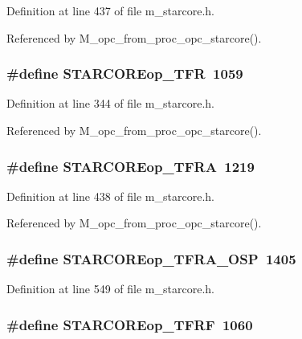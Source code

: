 Definition at line 437 of file m\_\-starcore.h.

Referenced by M\_\-opc\_\-from\_\-proc\_\-opc\_\-starcore().
\subsubsection{\setlength{\rightskip}{0pt plus 5cm}\#define STARCOREop\_\-TFR~1059}\label{m__starcore_8h_9c209d81e3bf11c5d85ed3bee68bef63}




Definition at line 344 of file m\_\-starcore.h.

Referenced by M\_\-opc\_\-from\_\-proc\_\-opc\_\-starcore().
\subsubsection{\setlength{\rightskip}{0pt plus 5cm}\#define STARCOREop\_\-TFRA~1219}\label{m__starcore_8h_54b0ceb600c829cc5abe0441f08fc1ee}




Definition at line 438 of file m\_\-starcore.h.

Referenced by M\_\-opc\_\-from\_\-proc\_\-opc\_\-starcore().
\subsubsection{\setlength{\rightskip}{0pt plus 5cm}\#define STARCOREop\_\-TFRA\_\-OSP~1405}\label{m__starcore_8h_9b4ae02415f67aac8e24347346ad8bcb}




Definition at line 549 of file m\_\-starcore.h.
\subsubsection{\setlength{\rightskip}{0pt plus 5cm}\#define STARCOREop\_\-TFRF~1060}\label{m__starcore_8h_b7ffdd74e4cdb15c761086899abf7798}




